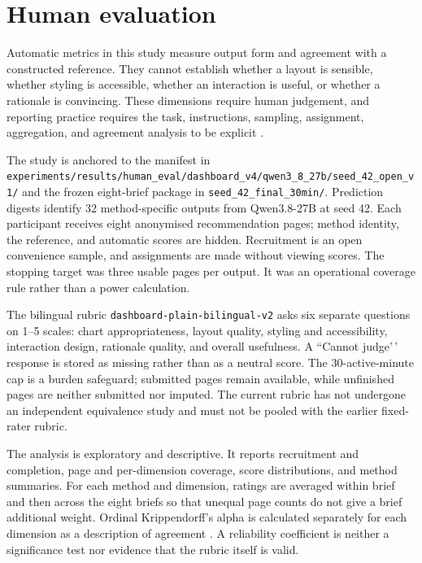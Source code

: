 \section{Human evaluation}

Automatic metrics in this study measure output form and agreement with a constructed reference. They cannot establish whether a layout is sensible, whether styling is accessible, whether an interaction is useful, or whether a rationale is convincing. These dimensions require human judgement, and reporting practice requires the task, instructions, sampling, assignment, aggregation, and agreement analysis to be explicit \cite{vanderlee2019human}.

The study is anchored to the manifest in \nolinkurl{experiments/results/human_eval/dashboard_v4/qwen3_8_27b/seed_42_open_v1/} and the frozen eight-brief package in \texttt{seed\_42\_final\_30min/}. Prediction digests identify 32 method-specific outputs from Qwen3.8-27B at seed 42. Each participant receives eight anonymised recommendation pages; method identity, the reference, and automatic scores are hidden. Recruitment is an open convenience sample, and assignments are made without viewing scores. The stopping target was three usable pages per output. It was an operational coverage rule rather than a power calculation.

The bilingual rubric \nolinkurl{dashboard-plain-bilingual-v2} asks six separate questions on 1--5 scales: chart appropriateness, layout quality, styling and accessibility, interaction design, rationale quality, and overall usefulness. A ``Cannot judge'\,' response is stored as missing rather than as a neutral score. The 30-active-minute cap is a burden safeguard; submitted pages remain available, while unfinished pages are neither submitted nor imputed. The current rubric has not undergone an independent equivalence study and must not be pooled with the earlier fixed-rater rubric.

The analysis is exploratory and descriptive. It reports recruitment and completion, page and per-dimension coverage, score distributions, and method summaries. For each method and dimension, ratings are averaged within brief and then across the eight briefs so that unequal page counts do not give a brief additional weight. Ordinal Krippendorff's alpha is calculated separately for each dimension as a description of agreement \cite{krippendorff2018content}. A reliability coefficient is neither a significance test nor evidence that the rubric itself is valid.

